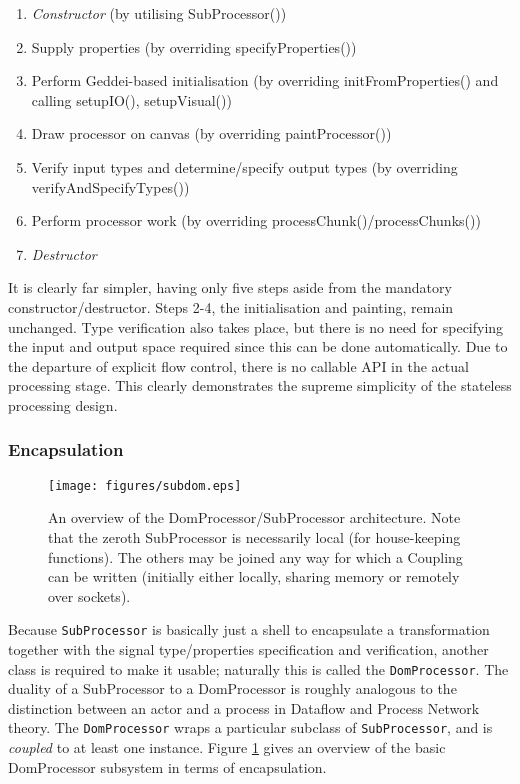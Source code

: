 \begin{enumerate}
\item \textit{Constructor} (by utilising SubProcessor())
\item Supply properties (by overriding specifyProperties())
\item Perform Geddei-based initialisation (by overriding initFromProperties() and calling setupIO(), setupVisual())
\item Draw processor on canvas (by overriding paintProcessor())
\item Verify input types and determine/specify output types (by overriding verifyAndSpecifyTypes())
\item Perform processor work (by overriding processChunk()/processChunks())
\item \textit{Destructor}
\end{enumerate}

It is clearly far simpler, having only five steps aside from the mandatory constructor/destructor. Steps 2-4, the initialisation and painting, remain unchanged. Type verification also takes place, but there is no need for specifying the input and output space required since this can be done automatically. Due to the departure of explicit flow control, there is no callable API in the actual processing stage. This clearly demonstrates the supreme simplicity of the stateless processing design.

\subsubsection{Encapsulation}

\begin{figure}[ht!]
\centering
\texttt{[image: figures/subdom.eps]}
\caption{An overview of the DomProcessor/SubProcessor architecture. Note that the zeroth SubProcessor is necessarily local (for house-keeping functions). The others may be joined any way for which a Coupling can be written (initially either locally, sharing memory or remotely over sockets).}
\label{fig:subdom}
\end{figure}

Because \texttt{SubProcessor} is basically just a shell to encapsulate a transformation together with the signal type/properties specification and verification, another class is required to make it usable; naturally this is called the \texttt{DomProcessor}. The duality of a SubProcessor to a DomProcessor is roughly analogous to the distinction between an actor and a process in Dataflow and Process Network theory. The \texttt{DomProcessor} wraps a particular subclass of \texttt{SubProcessor}, and is \textit{coupled} to at least one instance. Figure \ref{fig:subdom} gives an overview of the basic DomProcessor subsystem in terms of encapsulation.

